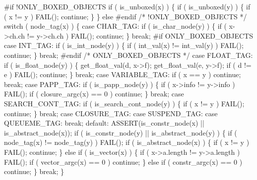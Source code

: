 #if !ONLY_BOXED_OBJECTS
        if ( is_unboxed(x) )
        \{
            if ( is_unboxed(y) )
            \{
                if ( x != y )
                    FAIL();
                continue;
            \}
        \}
        else
#endif /* !ONLY_BOXED_OBJECTS */
            switch ( node_tag(x) )
            \{
            case CHAR_TAG:
                if ( is_char_node(y) )
                \{
                    if ( x->ch.ch != y->ch.ch )
                        FAIL();
                    continue;
                \}
                break;
#if ONLY_BOXED_OBJECTS
            case INT_TAG:
                if ( is_int_node(y) )
                \{
                    if ( int_val(x) != int_val(y) )
                        FAIL();
                    continue;
                \}
                break;
#endif /* ONLY_BOXED_OBJECTS */
            case FLOAT_TAG:
                if ( is_float_node(y) )
                \{
                    get_float_val(d, x->f);
                    get_float_val(e, y->f);
                    if ( d != e )
                        FAIL();
                    continue;
                \}
                break;
            case VARIABLE_TAG:
                if ( x == y )
                    continue;
                break;
            case PAPP_TAG:
                if ( is_papp_node(y) )
                \{
                    if ( x->info != y->info )
                        FAIL();
                    if ( closure_argc(x) == 0 )
                        continue;
                \}
                break;
            case SEARCH_CONT_TAG:
                if ( is_search_cont_node(y) )
                \{
                    if ( x != y )
                        FAIL();
                    continue;
                \}
                break;
            case CLOSURE_TAG:
            case SUSPEND_TAG:
            case QUEUEME_TAG:
                break;
            default:
                ASSERT(is_constr_node(x) || is_abstract_node(x));
                if ( is_constr_node(y) || is_abstract_node(y) )
                \{
                    if ( node_tag(x) != node_tag(y) )
                        FAIL();
                    if ( is_abstract_node(x) )
                    \{
                        if ( x != y )
                            FAIL();
                        continue;
                    \}
                    else if ( is_vector(x) )
                    \{
                        if ( x->a.length != y->a.length )
                            FAIL();
                        if ( vector_argc(x) == 0 )
                            continue;
                    \}
                    else if ( constr_argc(x) == 0 )
                        continue;
                \}
                break;
            \}

